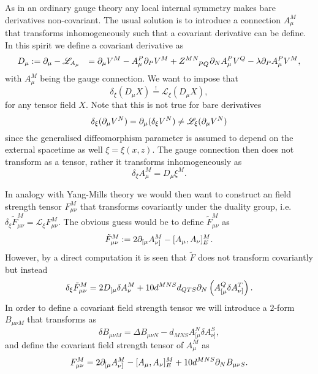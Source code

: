 As in an ordinary gauge theory any local internal symmetry makes bare derivatives non-covariant. The usual solution is to introduce a connection $A_\mu^M$ that transforms inhomogeneously such that a covariant derivative can be define. In this spirit we define a covariant derivative as 
\begin{equation}
    \begin{aligned}
        D_\mu &:= \pd_\mu -\mathscr{L}_{A_\mu}
             &= \pd_\mu V^M-A_\mu^P\pd_PV^M+\tensor{Z}{^{MN}_{PQ}}\pd_NA_\mu^PV^Q-\lambda\pd_P A_\mu^PV^M,
    \end{aligned}
\end{equation}
with $A_\mu^M$ being the gauge connection. We want to impose that 
\begin{equation}
    \delta_\xi (D_\mu X) \overset{!}{=} \mathscr{L}_\xi (D_\mu X),
\end{equation}
for any tensor field $X$. Note that this is not true for bare derivatives 
\begin{equation}
    \delta_\xi (\partial_\mu V^N) = \partial_\mu(\delta_\xi V^N) \neq \mathscr{L}_\xi (\partial_\mu V^N)
\end{equation}
since the generalised diffeomorphism parameter is assumed to depend on the external spacetime as well $\xi=\xi(x,z)$. The gauge connection then does not transform as a tensor, rather it transforms inhomogeneously as 
\begin{equation}
    \delta_\xi A_\mu^M = D_\mu\xi^M.
\end{equation}

In analogy with Yang-Mills theory we would then want to construct an field strength tensor $F^M_{\mu\nu}$ that transforms covariantly under the duality group, i.e.\ $\delta_\xi \tilde{F}^M_{\mu\nu}\overset{}=\mathscr{L}_\xi F^M_{\mu\nu}$. The obvious guess would be to define $\tilde{F}^{M}_{\mu\nu}$ as 
\begin{equation}
    \tilde{F}^M_{\mu\nu} := 2\partial_{[\mu}A_{\nu]}^M-[A_\mu,A_\nu]_E^M.
\end{equation}
However, by a direct computation it is seen that $\tilde{F}$ does not transform covariantly but instead
\begin{equation}
    \delta_\xi \tilde{F}_{\mu\nu}^M = 2D_{[\mu}\delta A_\nu^M+10d^{MNS}d_{QTS}\partial_N\left(A^Q_{[\mu}\delta A^T_{\nu]}\right).
\end{equation}
In order to define a covariant field strength tensor we will introduce a $2$-form $B_{\mu\nu M}$ that transforms as 
\begin{equation}
    \delta B_{\mu\nu M} = \Delta B_{\mu\nu N}-d_{MNS}A^N_{[\mu}\delta A^S_{\nu]},
\end{equation}
and define the covariant field strength tensor of $A^M_\mu$ as 
\begin{equation}
    F_{\mu\nu}^M = 2\partial_{[\mu}A_{\nu]}^M-[A_\mu,A_\nu]_E^M+10d^{MNS}\partial_NB_{\mu\nu S}.
\end{equation}

